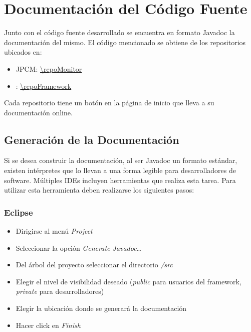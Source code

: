 \section{Documentación del Código Fuente}
\label{genJavadoc}
Junto con el código fuente desarrollado se encuentra en formato Javadoc la
documentación del mismo. El código mencionado se obtiene de los repositorios
ubicados en:
\begin{itemize}
  \item JPCM: \url{\repoMonitor}
  \item \nombreFramework: \url{\repoFramework}
\end{itemize}

Cada repositorio tiene un botón en la página de inicio que lleva a su
documentación online.

\subsection{Generación de la Documentación}
Si se desea construir la documentación, al ser Javadoc un formato estándar,
existen intérpretes que lo llevan a una forma legible para desarrolladores de
software. Múltiples IDEs incluyen herramientas que realiza esta tarea.
Para utilizar esta herramienta deben realizarse los siguientes pasos:

\subsubsection* {Eclipse}
\begin{itemize}
  \item Dirigirse al menú \textit{Project}
  \item Seleccionar la opción \textit{Generate Javadoc\ldots}
  \item Del árbol del proyecto seleccionar el directorio \textit{/src}
  \item Elegir el nivel de visibilidad deseado (\textit{public} para usuarios
  del framework, \textit{private} para desarrolladores)
  \item Elegir la ubicación donde se generará la documentación
  \item Hacer click en \textit{Finish}
\end{itemize}

